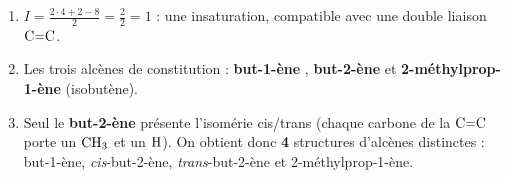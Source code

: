 \documentclass[11pt,a4paper]{article}
\begin{document}
\begin{corrige}
\begin{enumerate}[label=\alph*)]
  \item $I=\frac{2\cdot4+2-8}{2}=\frac{2}{2}=1$ : une insaturation, compatible avec une double liaison $\ce{C=C}$.
  \item Les trois alcènes de constitution : \textbf{but-1-ène} , \textbf{but-2-ène}  et \textbf{2-méthylprop-1-ène}  (isobutène).
  \item Seul le \textbf{but-2-ène} présente l'isomérie cis/trans (chaque carbone de la $\ce{C=C}$ porte un $\ce{CH3}$ et un $\ce{H}$). On obtient donc \textbf{4} structures d'alcènes distinctes : but-1-ène, \emph{cis}-but-2-ène, \emph{trans}-but-2-ène et 2-méthylprop-1-ène.
\end{enumerate}
\end{corrige}
\end{document}
